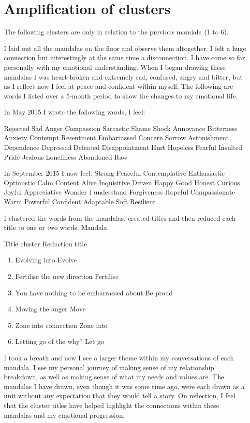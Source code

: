 \chapter{Amplification of clusters}




The following clusters are only in relation to the previous mandala (1 to 6). 

I laid out all the mandalas on the floor and observe them altogether. I felt a huge connection but interestingly at the same time a disconnection. I have come so far personally with my emotional understanding. When I began drawing these mandalas I was heart-broken and extremely sad, confused, angry and bitter, but as I reflect now I feel at peace and confident within myself. The following are words I listed over a 5-month period to show the changes to my emotional life. 

In May 2015 I wrote the following words, I feel:

Rejected
Sad
Anger
Compassion
Sarcastic
Shame
Shock
Annoyance
Bitterness
Anxiety
Contempt
Resentment
Embarrassed
Concern
Sorrow
Astonishment
Dependence
Depressed
Defeated
Disappointment
Hurt
Hopeless
Fearful
Insulted
Pride
Jealous 
Loneliness
Abandoned 
Raw


In September 2015 I now feel:
Strong
Peaceful
Contemplative
Enthusiastic
Optimistic
Calm
Content
Alive
Inquisitive
Driven
Happy
Good
Honest
Curious
Joyful
Appreciative 
Wonder
I understand
Forgiveness 
Hopeful
Compassionate 
Warm
Powerful 
Confident 
Adaptable 
Soft
Resilient  


I clustered the words from the mandalas, created titles and then reduced each title to one or two words:
Mandala

Title cluster
Reduction title
\begin{enumerate}
\item Evolving into
Evolve
\item Fertilise the new direction 
Fertilise 
\item You have nothing to be embarrassed about 
Be proud
\item Moving the anger 
Move
\item Zone into connection 
Zone into 
\item Letting go of the why?
Let go
\end{enumerate}


I took a breath and now I see a larger theme within my conversations of each mandala. I see my personal journey of making sense of my relationship breakdown, as well as making sense of what my needs and values are. The mandalas I have drawn, even though it was some time ago, were each drawn as a unit without any expectation that they would tell a story. On reflection, I feel that the cluster titles have helped highlight the connections within these mandalas and my emotional progression. 
 

